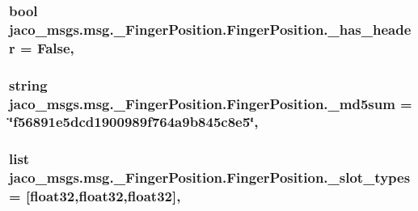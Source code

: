 \subsubsection[{\texorpdfstring{\+\_\+has\+\_\+header}{_has_header}}]{\setlength{\rightskip}{0pt plus 5cm}bool jaco\+\_\+msgs.\+msg.\+\_\+\+Finger\+Position.\+Finger\+Position.\+\_\+has\+\_\+header = False\hspace{0.3cm}{\ttfamily [static]}, {\ttfamily [private]}}\hypertarget{classjaco__msgs_1_1msg_1_1__FingerPosition_1_1FingerPosition_a4dca820040ec271e4a3aa926e49b7669}{}\label{classjaco__msgs_1_1msg_1_1__FingerPosition_1_1FingerPosition_a4dca820040ec271e4a3aa926e49b7669}
\subsubsection[{\texorpdfstring{\+\_\+md5sum}{_md5sum}}]{\setlength{\rightskip}{0pt plus 5cm}string jaco\+\_\+msgs.\+msg.\+\_\+\+Finger\+Position.\+Finger\+Position.\+\_\+md5sum = \char`\"{}f56891e5dcd1900989f764a9b845c8e5\char`\"{}\hspace{0.3cm}{\ttfamily [static]}, {\ttfamily [private]}}\hypertarget{classjaco__msgs_1_1msg_1_1__FingerPosition_1_1FingerPosition_a00418419cdbb4cc150f6d2e881b642c1}{}\label{classjaco__msgs_1_1msg_1_1__FingerPosition_1_1FingerPosition_a00418419cdbb4cc150f6d2e881b642c1}
\subsubsection[{\texorpdfstring{\+\_\+slot\+\_\+types}{_slot_types}}]{\setlength{\rightskip}{0pt plus 5cm}list jaco\+\_\+msgs.\+msg.\+\_\+\+Finger\+Position.\+Finger\+Position.\+\_\+slot\+\_\+types = \mbox{[}\textquotesingle{}float32\textquotesingle{},\textquotesingle{}float32\textquotesingle{},\textquotesingle{}float32\textquotesingle{}\mbox{]}\hspace{0.3cm}{\ttfamily [static]}, {\ttfamily [private]}}\hypertarget{classjaco__msgs_1_1msg_1_1__FingerPosition_1_1FingerPosition_a8a3a8d68617adfaaadf13c6fa6aecdeb}{}\label{classjaco__msgs_1_1msg_1_1__FingerPosition_1_1FingerPosition_a8a3a8d68617adfaaadf13c6fa6aecdeb}


